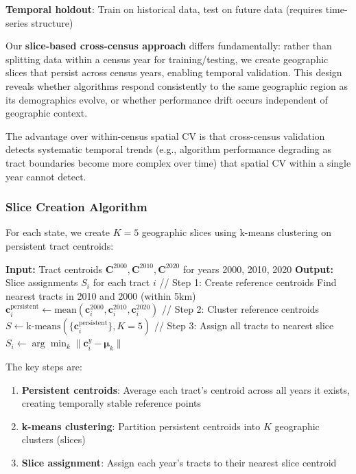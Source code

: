 \textbf{Temporal holdout}: Train on historical data, test on future data (requires time-series structure)

Our \textbf{slice-based cross-census approach} differs fundamentally: rather than splitting data within a census year for training/testing, we create geographic slices that persist across census years, enabling temporal validation. This design reveals whether algorithms respond consistently to the same geographic region as its demographics evolve, or whether performance drift occurs independent of geographic context.

The advantage over within-census spatial CV is that cross-census validation detects systematic temporal trends (e.g., algorithm performance degrading as tract boundaries become more complex over time) that spatial CV within a single year cannot detect.

\subsubsection{Slice Creation Algorithm}

For each state, we create $K=5$ geographic slices using k-means clustering on persistent tract centroids:

\begin{algorithm}
\caption{Slice Creation for Cross-Census Validation}
\begin{algorithmic}[1]
\State \textbf{Input:} Tract centroids $\mathbf{C}^{2000}, \mathbf{C}^{2010}, \mathbf{C}^{2020}$ for years 2000, 2010, 2020
\State \textbf{Output:} Slice assignments $S_i$ for each tract $i$
\State
\State // Step 1: Create reference centroids
    \State Find nearest tracts in 2010 and 2000 (within 5km)
    \State $\mathbf{c}_i^{\text{persistent}} \gets \text{mean}(\mathbf{c}_i^{2000}, \mathbf{c}_i^{2010}, \mathbf{c}_i^{2020})$
\EndFor
\State
\State // Step 2: Cluster reference centroids
\State $S \gets \text{k-means}(\{\mathbf{c}_i^{\text{persistent}}\}, K=5)$
\State
\State // Step 3: Assign all tracts to nearest slice
        \State $S_i \gets \arg\min_k \|\mathbf{c}_i^y - \boldsymbol{\mu}_k\|$ 
    \EndFor
\EndFor
\end{algorithmic}
\end{algorithm}

The key steps are:
\begin{enumerate}
    \item \textbf{Persistent centroids}: Average each tract's centroid across all years it exists, creating temporally stable reference points
    \item \textbf{k-means clustering}: Partition persistent centroids into $K$ geographic clusters (slices)
    \item \textbf{Slice assignment}: Assign each year's tracts to their nearest slice centroid
\end{enumerate}

